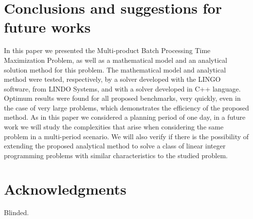 \documentclass[authoryear,preprint,12pt]{elsarticle}
\begin{document}
\section{Conclusions and suggestions for future works}
\label{sec:conclusions}

In this paper we presented the Multi-product Batch Processing Time Maximization Problem, as well as a mathematical model and an analytical solution method for this problem. The mathematical model and analytical method were tested, respectively, by a solver developed with the LINGO software, from LINDO Systems, and with a solver developed in C++ language. Optimum results were found for all proposed benchmarks, very quickly, even in the case of very large problems, which demonstrates the efficiency of the proposed method. As in this paper we considered a planning period of one day, in a future work we will study the complexities that arise when considering the same problem in a multi-period scenario. We will also verify if there is the possibility of extending the proposed analytical method to solve a class of linear integer programming problems with similar characteristics to the studied problem.

\section{Acknowledgments}
\label{sec:acknowledgments}

Blinded.


\end{document}
